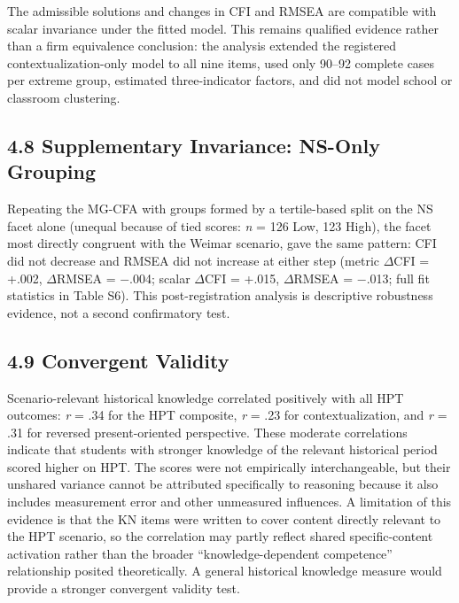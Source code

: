 \documentclass[PCJ,Unicode,screen,mode=plain]{cedram}
\begin{document}
The admissible solutions and changes in CFI and RMSEA are compatible
with scalar invariance under the fitted model. This remains qualified
evidence rather than a firm equivalence conclusion: the analysis
extended the registered contextualization-only model to all nine items,
used only 90--92 complete cases per extreme
group, estimated three-indicator factors, and did not model school or
classroom clustering.

\subsection*{4.8 Supplementary Invariance: NS-Only Grouping}\label{supplementary-invariance-ns-only-grouping}

Repeating the MG-CFA with groups formed by a tertile-based split on the NS
facet alone (unequal because of tied scores: \emph{n} = 126 Low, 123 High),
the facet most directly congruent with the Weimar scenario, gave the same
pattern: CFI did not decrease and RMSEA did not increase at either step
(metric \(\Delta\)CFI = +.002, \(\Delta\)RMSEA = $-$.004; scalar
\(\Delta\)CFI = +.015, \(\Delta\)RMSEA = $-$.013; full fit statistics in
Table S6). This post-registration analysis is descriptive robustness evidence,
not a second confirmatory test.

\subsection*{4.9 Convergent Validity}\label{convergent-validity}

Scenario-relevant historical knowledge correlated positively with all
HPT outcomes: \emph{r} = .34 for the HPT composite, \emph{r} = .23 for contextualization, and \emph{r} = .31
for reversed present-oriented perspective. These moderate correlations indicate that
students with stronger knowledge of the relevant historical period
scored higher on HPT. The scores were not empirically interchangeable,
but their unshared variance cannot be attributed specifically to
reasoning because it also includes measurement error and other
unmeasured influences. A limitation of this evidence is that
the KN items were written to cover content directly relevant to the
HPT scenario, so the correlation may partly reflect shared
specific-content activation rather than the broader
``knowledge-dependent competence'' relationship posited theoretically.
A general historical knowledge measure would provide a stronger
convergent validity test.
\end{document}
